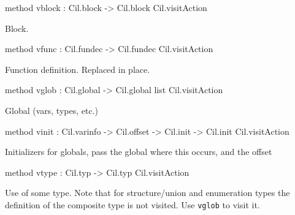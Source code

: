 \documentclass[11pt]{article}
\begin{document}
\begin{ocamldocobjectend}
\label{method:Cil.cilVisitor.vblock}\begin{ocamldoccode}
method vblock : Cil.block -> Cil.block Cil.visitAction
\end{ocamldoccode}
\begin{ocamldocdescription}
Block.


\end{ocamldocdescription}


\label{method:Cil.cilVisitor.vfunc}\begin{ocamldoccode}
method vfunc : Cil.fundec -> Cil.fundec Cil.visitAction
\end{ocamldoccode}
\begin{ocamldocdescription}
Function definition. 
                                                    Replaced in place.


\end{ocamldocdescription}


\label{method:Cil.cilVisitor.vglob}\begin{ocamldoccode}
method vglob : Cil.global -> Cil.global list Cil.visitAction
\end{ocamldoccode}
\begin{ocamldocdescription}
Global (vars, types,
                                                      etc.)


\end{ocamldocdescription}


\label{method:Cil.cilVisitor.vinit}\begin{ocamldoccode}
method vinit :
  Cil.varinfo -> Cil.offset -> Cil.init -> Cil.init Cil.visitAction
\end{ocamldoccode}
\begin{ocamldocdescription}
Initializers for globals, 
 pass the global where this 
 occurs, and the offset


\end{ocamldocdescription}


\label{method:Cil.cilVisitor.vtype}\begin{ocamldoccode}
method vtype : Cil.typ -> Cil.typ Cil.visitAction
\end{ocamldoccode}
\begin{ocamldocdescription}
Use of some type. Note 
 that for structure/union 
 and enumeration types the 
 definition of the 
 composite type is not 
 visited. Use {\tt{vglob}} to 
 visit it.



\end{ocamldocdescription}
\end{ocamldocobjectend}
\end{document}

